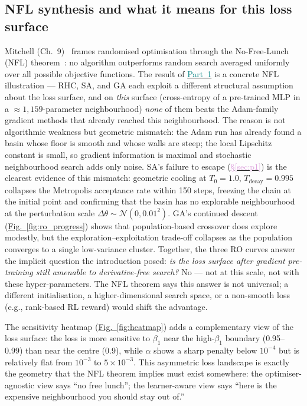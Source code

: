 \documentclass[conference]{IEEEtran}
\newcommand{\figref}[1]{\hyperref[#1]{\textcolor{denim_comp}{Fig.~\ref*{#1}}}}
\newcommand{\secref}[1]{\hyperref[#1]{\textcolor{plum}{\S\ref*{#1}}}}
\newcommand{\partref}[2]{\hyperref[#2]{\textcolor{teal}{Part~#1}}}
\begin{document}
\subsection{NFL synthesis and what it means for this loss surface}\label{sec:disc:nfl}
Mitchell (Ch.~9)~\cite{mitchell1997} frames randomised optimisation through the
No-Free-Lunch (NFL) theorem~\cite{wolpert1996nfl}: no algorithm outperforms
random search averaged uniformly over all possible objective functions.
The result of \partref{1}{sec:p1} is a concrete NFL illustration --- RHC, SA, and GA
each exploit a different structural assumption about the loss surface,
and on \emph{this} surface (cross-entropy of a pre-trained MLP in a
${\approx}1{,}159$-parameter neighbourhood) \emph{none} of them beats the
Adam-family gradient methods that already reached this neighbourhood.
The reason is not algorithmic weakness but geometric mismatch: the Adam
run has already found a basin whose floor is smooth and whose walls are
steep; the local Lipschitz constant is small, so gradient information is
maximal and stochastic neighbourhood search adds only noise.
SA's failure to escape (\secref{sec:p1}) is the clearest evidence of this
mismatch: geometric cooling at $T_0{=}1.0$, $T_{\text{decay}}{=}0.995$
collapses the Metropolis acceptance rate within 150 steps, freezing the
chain at the initial point and confirming that the basin has no explorable
neighbourhood at the perturbation scale $\Delta\theta{\sim}\mathcal{N}(0,0.01^2)$.
GA's continued descent (\figref{fig:ro_progress}) shows that population-based
crossover does explore modestly, but the exploration--exploitation trade-off
collapses as the population converges to a single low-variance cluster.
Together, the three RO curves answer the implicit question the introduction
posed: \emph{is the loss surface after gradient pre-training still amenable
to derivative-free search?}
No --- not at this scale, not with these hyper-parameters.
The NFL theorem says this answer is not universal; a different initialisation,
a higher-dimensional search space, or a non-smooth loss (e.g., rank-based RL
reward) would shift the advantage.

The sensitivity heatmap (\figref{fig:heatmap}) adds a complementary view
of the loss surface: the loss is more sensitive to $\beta_1$ near the
high-$\beta_1$ boundary (0.95--0.99) than near the centre (0.9), while
$\alpha$ shows a sharp penalty below $10^{-4}$ but is relatively flat from
$10^{-3}$ to $5{\times}10^{-3}$.
This asymmetric loss landscape is exactly the geometry that the NFL theorem
implies must exist somewhere: the optimiser-agnostic view says ``no free
lunch''; the learner-aware view says ``here is the expensive neighbourhood
you should stay out of.''
\end{document}
